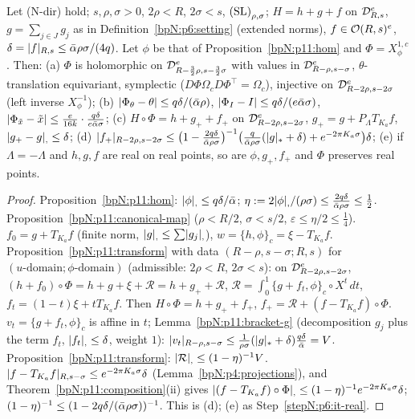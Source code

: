 \begin{theorem}\label{bpN:p11:iterative}
Let (N-dir) hold; $s,\rho,\sigma>0$, $2\rho<R$, $2\sigma<s$, $\textup{(SL)}_{\rho,\sigma}$; $H=h+g+f$ on $\mathcal D_{R,s}^e$, $g=\sum_{j\in J}g_j$ as in Definition~\ref{bpN:p6:setting} (extended norms), $f\in\mathcal O(R,s)^e$, $\delta=\lvert f\rvert_{R,s}\le\bar\alpha\rho\sigma/(4q)$. Let $\phi$ be that of Proposition~\ref{bpN:p11:hom} and $\Phi=X^{1,c}_\phi$. Then:
(a) $\Phi$ is holomorphic on $\mathcal D_{R-\frac32\rho,s-\frac32\sigma}^e$ with values in $\mathcal D_{R-\rho,s-\sigma}^e$, $\theta$-translation equivariant, symplectic ($D\Phi\Omega_cD\Phi^\top=\Omega_c$), injective on $\mathcal D_{R-2\rho,s-2\sigma}^e$ (left inverse $X^{-1}_\phi$);
(b) $\lvert \Phi_\theta-\theta\rvert\le q\delta/(\bar\alpha\rho)$, $\lvert \Phi_I-I\rvert\le q\delta/(e\bar\alpha\sigma)$, $\lvert \Phi_{\tilde x}-\tilde x\rvert\le\frac e{16k}\cdot\frac{q\delta}{e\bar\alpha\sigma}$;
(c) $H\circ\Phi=h+g_++f_+$ on $\mathcal D_{R-2\rho,s-2\sigma}^e$, $g_+=g+P_\Lambda T_{K_a}f$, $\lvert g_+-g\rvert_{,}\le\delta$;
(d) $\lvert f_+\rvert_{R-2\rho,s-2\sigma}\le\bigl(1-\frac{2q\delta}{\bar\alpha\rho\sigma}\bigr)^{-1}\bigl(\frac q{\bar\alpha\rho\sigma}(\lvert g\rvert_*+\delta)+e^{-2\pi K_a\sigma}\bigr)\delta$;
(e) if $\Lambda=-\Lambda$ and $h,g,f$ are real on real points, so are $\phi,g_+,f_+$ and $\Phi$ preserves real points.
\end{theorem}
\begin{proof}
\label{stepN:p11:it-gen} Proposition~\ref{bpN:p11:hom}: $\lvert \phi\rvert_{,}\le q\delta/\bar\alpha$; $\eta:=2\lvert \phi\rvert_{,}/(\rho\sigma)\le\frac{2q\delta}{\bar\alpha\rho\sigma}\le\frac12$.
\label{stepN:p11:it-map} Proposition~\ref{bpN:p11:canonical-map} ($\rho<R/2$, $\sigma<s/2$, $\varepsilon\le\eta/2\le\frac14$).
\label{stepN:p11:it-taylor} $f_0=g+T_{K_a}f$ (finite norm, $\lvert g\rvert_{,}\le\sum\lvert g_j\rvert_{,}$), $w=\{h,\phi\}_c=\xi-T_{K_a}f$. Proposition~\ref{bpN:p11:transform} with data $(R-\rho,s-\sigma;R,s)$ for $(u\text{-domain};\phi\text{-domain})$ (admissible: $2\rho<R$, $2\sigma<s$): on $\mathcal D_{R-2\rho,s-2\sigma}^e$, $(h+f_0)\circ\Phi=h+g+\xi+\mathcal R=h+g_++\mathcal R$, $\mathcal R=\int_0^1\{g+f_t,\phi\}_c\circ X^t\,dt$, $f_t=(1-t)\xi+tT_{K_a}f$. Then $H\circ\Phi=h+g_++f_+$, $f_+=\mathcal R+(f-T_{K_a}f)\circ\Phi$.
\label{stepN:p11:it-est} $v_t=\{g+f_t,\phi\}_c$ is affine in $t$; Lemma~\ref{bpN:p11:bracket-g} (decomposition $g_j$ plus the term $f_t$, $\lvert f_t\rvert_{,}\le\delta$, weight $1$): $\lvert v_t\rvert_{R-\rho,s-\sigma}\le\frac1{\rho\sigma}(\lvert g\rvert_*+\delta)\frac{q\delta}{\bar\alpha}=V$. Proposition~\ref{bpN:p11:transform}: $\lvert \mathcal R\rvert_{,}\le(1-\eta)^{-1}V$. $\lvert f-T_{K_a}f\rvert_{R,s-\sigma}\le e^{-2\pi K_a\sigma}\delta$ (Lemma~\ref{bpN:p4:projections}), and Theorem~\ref{bpN:p11:composition}(ii) gives $\lvert (f-T_{K_a}f)\circ\Phi\rvert_{,}\le(1-\eta)^{-1}e^{-2\pi K_a\sigma}\delta$; $(1-\eta)^{-1}\le(1-2q\delta/(\bar\alpha\rho\sigma))^{-1}$. This is (d); (e) as Step~\ref{stepN:p6:it-real}.
\end{proof}

